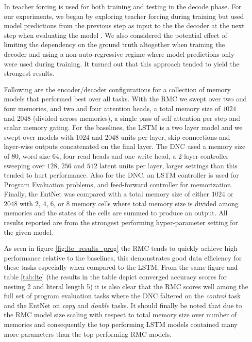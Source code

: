 \documentclass{article}
\begin{document}
In \cite{zaremba2014lte} teacher forcing is used for both training and testing in the decode phase.  For our experiments, we began by exploring teacher forcing during training but used model predictions from the previous step as input to the the decoder at the next step when evaluating the model \cite{sutskever2014seq2seq}.  We also considered the potential effect of limiting the dependency on the ground truth altogether when training the decoder \cite{sbengio2015schedsamp} and using a non-auto-regressive regime where model predictions only were used during training.  It turned out that this approach tended to yield the strongest results.

Following are the encoder/decoder configurations for a collection of memory models that performed best over all tasks. With the RMC we swept over two and four memories, and two and four attention heads, a total memory size of $1024$ and $2048$ (divided across memories), a single pass of self attention per step and scalar memory gating.  For the baselines, the LSTM is a two layer model and we swept over models with $1024$ and $2048$ units per layer, skip connections and layer-wise outputs concatenated on the final layer.  The DNC used a memory size of $80$, word size $64$, four read heads and one write head, a 2-layer controller sweeping over $128$, $256$ and $512$ latent units per layer, larger settings than this tended to hurt performance.  Also for the DNC, an LSTM controller is used for Program Evaluation problems, and feed-forward controller for memorization.  Finally, the EntNet was compared with a total memory size of either $1024$ or $2048$ with $2$, $4$, $6$, or $8$ memory cells where total memory size is divided among memories and the states of the cells are summed to produce an output.  All results reported are from the strongest performing hyper-parameter setting for the given model. 

As seen in figure \ref{fig:lte_results_prog} the RMC tends to quickly achieve high performance relative to the baselines, this demonstrates good data efficiency for these tasks especially when compared to the LSTM.  From the same figure and table \ref{tab:lte} (the results in the table depict converged accuracy scores for nesting 2 and literal length 5) it is also clear that the RMC scores well among the full set of program evaluation tasks where the DNC faltered on the \textit{control} task and the EntNet on \textit{copy} and \textit{double} tasks.  It should finally be noted that due to the RMC model size scaling with respect to total memory size over number of memories and consequently the top performing LSTM models contained many more parameters than the top performing RMC models.
\end{document}
